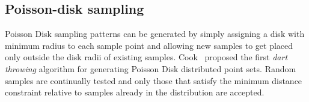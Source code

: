 
%
\subsection{Poisson-disk sampling}
Poisson Disk sampling patterns can be generated by simply assigning a disk with minimum radius to each sample point and allowing new samples to get placed only outside the disk radii of existing samples. Cook~\cite{Cook:1986:SSC} proposed the first \emph{dart throwing} 
algorithm for generating Poisson Disk distributed point sets. 
Random samples are continually tested and only those that satisfy the minimum
distance constraint relative to samples already in the distribution
are accepted.

